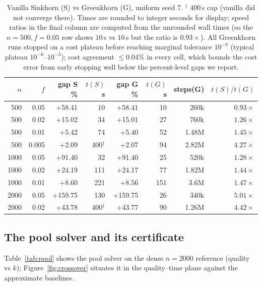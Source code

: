 \documentclass[11pt]{article}
\theoremstyle{remark}
\begin{document}
\begin{table}[t]
\centering
\small
\begin{tabular}{rrrrrrrr}
\toprule
$n$ & $f$ & gap S \% & $t(S)$ s & gap G \% & $t(G)$ s & steps(G) & $t(S)/t(G)$ \\
\midrule
500  & 0.05 & +58.41 & 10  & +58.41 & 10 & 260k  & $0.93\times$ \\
500  & 0.02 & +15.02 & 34  & +15.01 & 27 & 760k  & $1.26\times$ \\
500  & 0.01 & +5.42  & 74  & +5.40  & 52 & 1.48M & $1.45\times$ \\
500  & 0.005 & +2.09 & 400$^\dagger$ & +2.07 & 94 & 2.82M & $4.27\times$ \\
1000 & 0.05 & +91.40 & 32  & +91.40 & 25 & 520k  & $1.28\times$ \\
1000 & 0.02 & +24.19 & 111 & +24.17 & 77 & 1.82M & $1.44\times$ \\
1000 & 0.01 & +8.60  & 221 & +8.56  & 151 & 3.6M  & $1.47\times$ \\
2000 & 0.05 & +159.75 & 130 & +159.75 & 26 & 340k & $5.01\times$ \\
2000 & 0.02 & +43.78 & 400$^\dagger$ & +43.77 & 90 & 1.26M & $4.42\times$ \\
\bottomrule
\end{tabular}
\caption{Vanilla Sinkhorn (S) vs Greenkhorn (G), uniform seed 7.
$^\dagger$ 400\,s cap (vanilla did not converge there). Times are rounded
to integer seconds for display; speed ratios in the final column are
computed from the unrounded wall times (so the $n=500,f=0.05$ row shows
$10$\,s vs $10$\,s but the ratio is $0.93\times$). All Greenkhorn runs
stopped on a cost plateau before reaching marginal tolerance $10^{-9}$
(typical plateau $10^{-6}$--$10^{-3}$); cost agreement $\le 0.04\%$ in every
cell, which bounds the cost error from early stopping well below the
percent-level gaps we report.}
\label{tab:ghead}
\end{table}

\subsection{The pool solver and its certificate}
\label{sec:pool}
Table~\ref{tab:pool} shows the pool solver on the dense $n=2000$ reference
(quality vs $k$); Figure~\ref{fig:crossover} situates it in the
quality--time plane against the approximate baselines.
\end{document}
